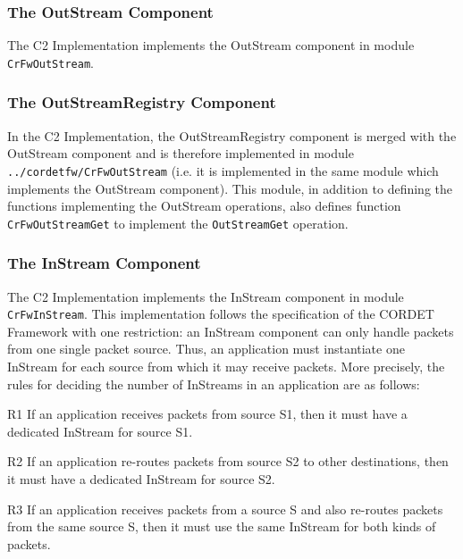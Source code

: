 \documentclass[a4paper,10pt]{article}
\newenvironment{fw_itemize}						%
{\begin{itemize}
  \setlength{\itemsep}{1mm}
  \setlength{\parskip}{0pt}
  \setlength{\parsep}{0pt}}
{\end{itemize}}
\begin{document}
\subsubsection{The OutStream Component}\label{sec:OutStream}


The C2 Implementation implements the OutStream component in module \texttt{CrFwOutStream}. 


\subsubsection{The OutStreamRegistry Component}\label{sec:OutStreamRegistry}


In the C2 Implementation, the OutStreamRegistry component is merged with the OutStream component and is therefore implemented in module \texttt{../cordetfw/CrFwOutStream} (i.e. it is implemented in the same module which implements the OutStream component). This module, in addition to defining the functions implementing the OutStream operations, also defines function \texttt{CrFwOutStreamGet} to implement the \texttt{OutStreamGet} operation. 


\subsubsection{The InStream Component}\label{sec:InStream}


The C2 Implementation implements the InStream component in module \texttt{CrFwInStream}. This implementation follows the specification of the CORDET Framework with one restriction: an InStream component can only handle packets from one single packet source. Thus, an application must instantiate one InStream for each source from which it may receive packets. More precisely, the rules for deciding the number of InStreams in an application are as follows:

\begin{fw_itemize}
\item[R1]{If an application receives packets from source S1, then it must have a dedicated InStream for source S1.}
\item[R2]{If an application re-routes packets from source S2 to other destinations, then it must have a dedicated InStream for source S2.}
\item[R3]{If an application receives packets from a source S and also re-routes packets from the same source S, then it must use the same InStream for both kinds of packets.}
\end{fw_itemize}
\end{document}
